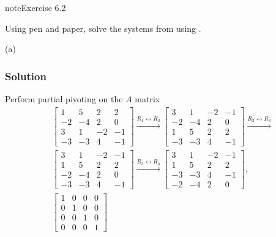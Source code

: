 \documentclass[letterpaper,10pt,english]{jupyterBook}
\begin{document}
\begin{sphinxadmonition}{note}{Exercise 6.2}

\sphinxAtStartPar
Using pen and paper, solve the systems from {\hyperref[\detokenize{6_Direct_methods/6.6_Direct_methods_exercises:ex6-1}]{}} using {\hyperref[\detokenize{6_Direct_methods/6.2_LUP_decomposition:lup-section}]{}}.

\sphinxAtStartPar
(a)
\subsubsection*{Solution}

\sphinxAtStartPar
Perform partial pivoting on the \(A\) matrix
\begin{align*}
    & \left[\begin{matrix}1 & 5 & 2 & 2\\-2 & -4 & 2 & 0\\3 & 1 & -2 & -1\\-3 & -3 & 4 & -1\end{matrix}\right]
    \xrightarrow{R_{1} \leftrightarrow R_{3}}
    \left[\begin{matrix}3 & 1 & -2 & -1\\-2 & -4 & 2 & 0\\1 & 5 & 2 & 2\\-3 & -3 & 4 & -1\end{matrix}\right]
    \xrightarrow{R_{2} \leftrightarrow R_{3}}\\
    &
    \left[\begin{matrix}3 & 1 & -2 & -1\\1 & 5 & 2 & 2\\-2 & -4 & 2 & 0\\-3 & -3 & 4 & -1\end{matrix}\right]
    \xrightarrow{R_{3} \leftrightarrow R_{4}}
    \left[\begin{matrix}3 & 1 & -2 & -1\\1 & 5 & 2 & 2\\-3 & -3 & 4 & -1\\-2 & -4 & 2 & 0\end{matrix}\right]
    , \\
    & \left[\begin{matrix}1 & 0 & 0 & 0\\0 & 1 & 0 & 0\\0 & 0 & 1 & 0\\0 & 0 & 0 & 1\end{matrix}\right]

\end{align*}
\end{sphinxadmonition}
\end{document}
